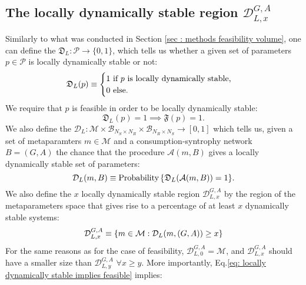 \documentclass[12pt, titlepage]{report}
\begin{document}
\subsection{The locally dynamically stable region \texorpdfstring{$\mathcal{D}^{G,A}_{L,x}$}{DLx}} \label{sec: dynamical stability methods locally dynamically stable region}
Similarly to what was conducted in Section \ref{sec : methods feasibility volume}, one can define the  $\mathfrak{D}_L: \mathcal{P} \rightarrow \{
0,1\}$, which tells us whether a given set of parameters $p \in \mathcal{P}$ is locally dynamically stable or not:
\begin{equation}
\mathfrak{D}_L(p)\equiv\begin{cases}
1 \text{ if } p \text{ is locally dynamically stable,} \\
0 \text{ else.}
\end{cases}
\end{equation}
We require that $p$ is feasible in order to be locally dynamically stable:
\begin{equation}
\mathfrak{D}_L(p)=1 \implies \mathfrak{F}(p)=1. \label{eq: locally dynamically stable implies feasible}
\end{equation}
We also define the  $\mathcal{D}_L: \mathcal{M} \times \mathcal{B}_{N_S \times N_R} \times \mathcal{B}_{N_R \times N_S} \rightarrow [0,1]$ which tells us, given a set of metaparamters $m \in \mathcal{M}$ and a consumption-syntrophy network $B=(G,A)$ the chance that the procedure $\mathcal{A}(m,B)$ gives a locally dynamically stable set of parameters:
\begin{equation}
{\mathcal{D}_L(m, B)\equiv\text{Probability}\left\{\mathfrak{D}_L(\mathcal{A}(m, B))=1\right\}}. \label{eq : dyn stab methods dynamical stability function}
\end{equation}
We also define the $x$ locally dynamically stable region $\mathcal{D}_{L,x}^{G,A}$ by the region of the metaparameters space that gives rise to a percentage of at least $x$ dynamically stable systems:
\begin{equation}
\mathcal{D}_{L,x}^{G,A} \equiv \left\{m \in \mathcal{M}: \mathcal{D}_L(m, (G,A)) \geq x \right\}
\end{equation}
For the same reasons as for the case of feasibility, $\mathcal{D}_{L,0}^{G,A}=\mathcal{M}$, and $\mathcal{D}_{L,x}^{G,A}$ should have a smaller size than $\mathcal{D}_{L,y}^{G,A}$ $\forall x \geq y$. More importantly, Eq.\eqref{eq: locally dynamically stable implies feasible} implies:
\end{document}
